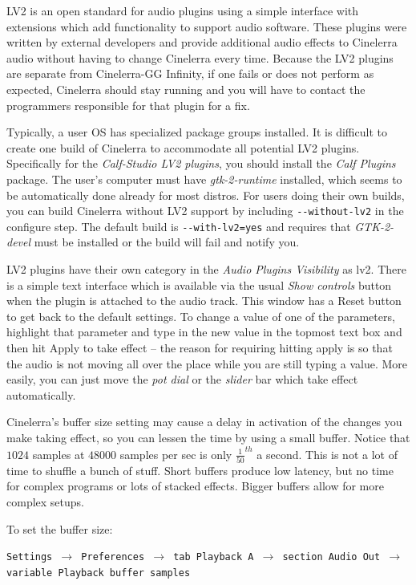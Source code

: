 LV2 is an open standard for audio plugins using a simple interface with extensions which add functionality to support audio software. These plugins were written by external developers and provide additional audio effects to Cinelerra audio without having to change Cinelerra every time. Because the LV2 plugins are separate from Cinelerra-GG Infinity, if one fails or does not perform as expected, Cinelerra should stay running and you will have to contact the programmers responsible for that plugin for a fix.

Typically, a user OS has specialized package groups installed. It is difficult to create one build of Cinelerra to accommodate all potential LV2 plugins. Specifically for the \textit{Calf-Studio LV2 plugins}, you should install the \textit{Calf Plugins} package. The user’s computer must have \textit{gtk-2-runtime} installed, which seems to be automatically done already for most distros. For users doing their own builds, you can build Cinelerra without LV2 support by including \texttt{-{}-without-lv2} in the configure step. The default build is \texttt{-{}-with-lv2=yes} and requires that \textit{GTK-2-devel} must be installed or the build will fail and notify you.

LV2 plugins have their own category in the \textit{Audio Plugins Visibility} as lv2. There is a simple text interface which is available via the usual \textit{Show controls} button when the plugin is attached to the audio track. This window has a Reset button to get back to the default settings. To change a value of one of the parameters, highlight that parameter and type in the new value in the topmost text box and then hit Apply to take effect -- the reason for requiring hitting apply is so that the audio is not moving all over the place while you are still typing a value. More easily, you can just move the \textit{pot dial} or the \textit{slider} bar which take effect automatically. 

Cinelerra’s buffer size setting may cause a delay in activation of the changes you make taking effect, so you can lessen the time by using a small buffer. Notice that $1024$ samples at $48000$ samples per sec is only $\frac{1}{50}^{th}$ a second. This is not a lot of time to shuffle a bunch of stuff. Short buffers produce low latency, but no time for complex programs or lots of stacked effects. Bigger buffers allow for more complex setups.

To set the buffer size:

\texttt{Settings $\rightarrow$ Preferences $\rightarrow$ tab Playback A $\rightarrow$ section Audio Out $\rightarrow$ variable Playback buffer samples}


